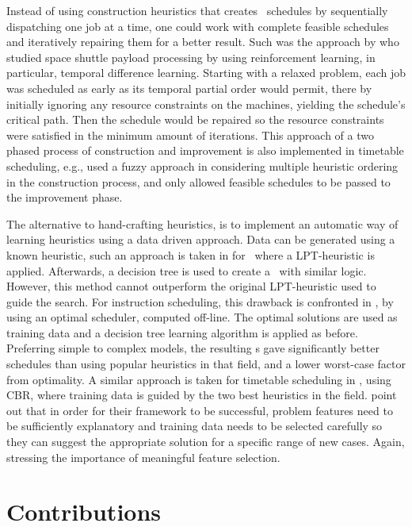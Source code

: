Instead of using construction heuristics that creates \jsp\ schedules by sequentially dispatching one job at a time, one could work with complete feasible schedules and iteratively repairing them for a better result. Such was the approach by \cite{Zhang95} who studied space shuttle payload processing by using reinforcement learning, in particular, temporal difference learning. Starting with a relaxed problem, each job was scheduled as early as its temporal partial order would permit, there by initially ignoring any resource constraints on the machines, yielding the schedule's critical path. Then the schedule would be repaired so the resource constraints were satisfied in the minimum amount of iterations.
This approach of a two phased process of construction and improvement is also implemented in timetable scheduling, e.g., \citet{Asmuni09} used a fuzzy approach in considering multiple heuristic ordering in the construction process, and only allowed feasible schedules to be passed to the improvement phase. 

The alternative to hand-crafting heuristics, is to implement an automatic way of learning heuristics using a data driven approach. %
Data can be generated using a known heuristic, such an approach is taken in 
\cite{Siggi05} for \jsp\, where a LPT-heuristic is applied. Afterwards, a 
decision tree is used to create a \dr\ with similar logic. However, this method 
cannot outperform the original LPT-heuristic used to guide the search. For 
instruction scheduling, this drawback is confronted in 
\citet{Malik08,Russell09,Siggi10}, by using an optimal scheduler, computed 
off-line. The optimal solutions are used as training data and a decision tree 
learning algorithm is applied as before. Preferring simple to complex models, 
the resulting \dr s gave significantly better schedules than using popular 
heuristics in that field, and a lower worst-case factor from optimality. A 
similar approach is taken for timetable scheduling in \cite{Burke06}, using 
CBR, where training data is guided by the two best heuristics 
in the field. 
\citeauthor{Burke06} point out that in order for their framework to be 
successful, problem features need to be sufficiently explanatory and training 
data needs to be selected carefully so they can suggest the appropriate 
solution for a specific range of new cases. 
Again, stressing the importance of meaningful feature selection. 

\section{Contributions}


